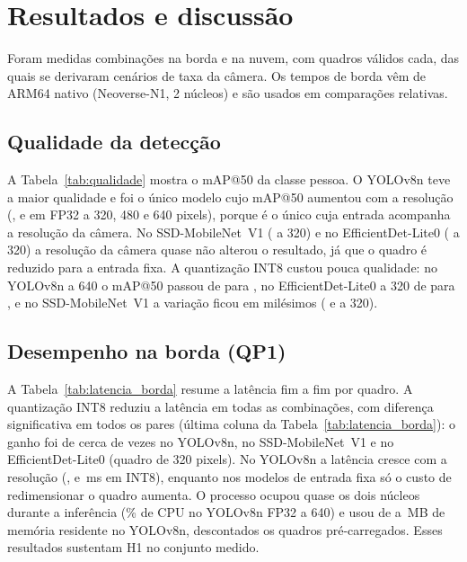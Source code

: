 \section{Resultados e discussão}
\label{resultados}

Foram medidas \nCombBorda{} combinações na borda e \nCombNuvem{} na nuvem, com \nQuadrosValidos{} quadros válidos cada, das quais se derivaram \nCenarios{} cenários de taxa da câmera. Os tempos de borda vêm de ARM64 nativo (Neoverse-N1, 2 núcleos) e são usados em comparações relativas.

\subsection{Qualidade da detecção}

A Tabela~\ref{tab:qualidade} mostra o mAP@50 da classe pessoa. O YOLOv8n teve a maior qualidade e foi o único modelo cujo mAP@50 aumentou com a resolução (\mapYoloFpTres{}, \mapYoloFpQuatro{} e \mapYoloFpSeis{} em FP32 a 320, 480 e 640 pixels), porque é o único cuja entrada acompanha a resolução da câmera. No SSD-MobileNet~V1 (\mapSsdFpTres{} a 320) e no EfficientDet-Lite0 (\mapEffdetFpTres{} a 320) a resolução da câmera quase não alterou o resultado, já que o quadro é reduzido para a entrada fixa. A quantização INT8 custou pouca qualidade: no YOLOv8n a 640 o mAP@50 passou de \mapYoloFpSeis{} para \mapYoloIntSeis{}, no EfficientDet-Lite0 a 320 de \mapEffdetFpTres{} para \mapEffdetIntTres{}, e no SSD-MobileNet~V1 a variação ficou em milésimos (\mapSsdFpTres{} e \mapSsdIntTres{} a 320).



\subsection{Desempenho na borda (QP1)}

A Tabela~\ref{tab:latencia_borda} resume a latência fim a fim por quadro. A quantização INT8 reduziu a latência em todas as combinações, com diferença significativa em todos os pares (última coluna da Tabela~\ref{tab:latencia_borda}): o ganho foi de cerca de \razaoYoloTres{} vezes no YOLOv8n, \razaoSsdTres{} no SSD-MobileNet~V1 e \razaoEffdetTres{} no EfficientDet-Lite0 (quadro de 320 pixels). No YOLOv8n a latência cresce com a resolução (\etoeYoloIntTres{}, \etoeYoloIntQuatro{} e \etoeYoloIntSeis{}\,ms em INT8), enquanto nos modelos de entrada fixa só o custo de redimensionar o quadro aumenta. O processo ocupou quase os dois núcleos durante a inferência (\cpuYoloFpSeis\% de CPU no YOLOv8n FP32 a 640) e usou de \rssYoloIntTres{} a \rssYoloFpSeis{}\,MB de memória residente no YOLOv8n, descontados os quadros pré-carregados. Esses resultados sustentam H1 no conjunto medido.

